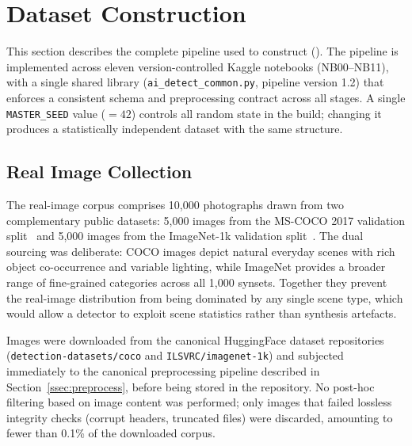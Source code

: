 
\section{Dataset Construction}
\label{sec:methodology}

This section describes the complete pipeline used to construct
\textbf{\datasetname} ().
The pipeline is implemented across eleven version-controlled Kaggle notebooks
(NB00--NB11), with a single shared library (\texttt{ai\_detect\_common.py},
pipeline version 1.2) that enforces a consistent schema and preprocessing
contract across all stages.
A single \texttt{MASTER\_SEED} value ($= 42$) controls all random state in
the build; changing it produces a statistically independent dataset with
the same structure.

\subsection{Real Image Collection}
\label{ssec:real}

The real-image corpus comprises 10,000 photographs drawn from two
complementary public datasets: 5,000 images from the MS-COCO 2017
validation split~\cite{lin2014coco} and 5,000 images from the
ImageNet-1k validation split~\cite{deng2009imagenet}.
The dual sourcing was deliberate: COCO images depict natural everyday
scenes with rich object co-occurrence and variable lighting, while
ImageNet provides a broader range of fine-grained categories across
all 1,000 synsets.
Together they prevent the real-image distribution from being dominated
by any single scene type, which would allow a detector to exploit
scene statistics rather than synthesis artefacts.

Images were downloaded from the canonical HuggingFace dataset
repositories (\texttt{detection-datasets/coco} and
\texttt{ILSVRC/imagenet-1k}) and subjected immediately to the canonical
preprocessing pipeline described in Section~\ref{ssec:preprocess},
before being stored in the repository.
No post-hoc filtering based on image content was performed; only images
that failed lossless integrity checks (corrupt headers, truncated files)
were discarded, amounting to fewer than 0.1\% of the downloaded corpus.

